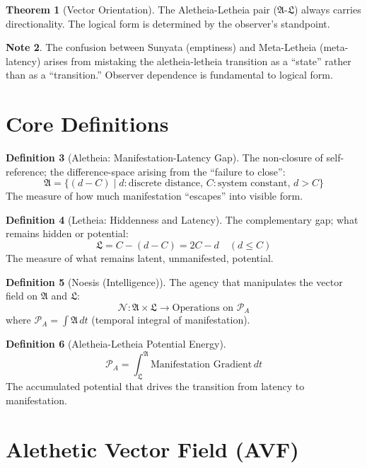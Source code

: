 \documentclass[12pt,a4paper]{article}
\theoremstyle{definition}
\newtheorem{definition}{Definition}[section]
\newtheorem{theorem}[definition]{Theorem}
\newtheorem{note}[definition]{Note}
\newcommand{\aletheia}{\mathfrak{A}}
\newcommand{\letheia}{\mathfrak{L}}
\newcommand{\noesis}{\mathcal{N}}
\newcommand{\powa}{\mathcal{P}_A}
\begin{document}
\begin{theorem}[Vector Orientation]
The Aletheia-Letheia pair ($\aletheia$-$\letheia$) always carries directionality. The logical form is determined by the observer's standpoint.
\end{theorem}

\begin{note}
The confusion between Sunyata (emptiness) and Meta-Letheia (meta-latency) arises from mistaking the aletheia-letheia transition as a ``state'' rather than as a ``transition.'' Observer dependence is fundamental to logical form.
\end{note}

\section{Core Definitions}

\begin{definition}[Aletheia: Manifestation-Latency Gap]
The non-closure of self-reference; the difference-space arising from the ``failure to close'':
\[
\aletheia = \{ (d - C) \mid d : \text{discrete distance}, \, C : \text{system constant}, \, d > C \}
\]
The measure of how much manifestation ``escapes'' into visible form.
\end{definition}

\begin{definition}[Letheia: Hiddenness and Latency]
The complementary gap; what remains hidden or potential:
\[
\letheia = C - (d - C) = 2C - d \quad (d \leq C)
\]
The measure of what remains latent, unmanifested, potential.
\end{definition}

\begin{definition}[Noesis (Intelligence)]
The agency that manipulates the vector field on $\aletheia$ and $\letheia$:
\[
\noesis : \aletheia \times \letheia \to \text{Operations on } \powa
\]
where $\powa = \int \aletheia \, dt$ (temporal integral of manifestation).
\end{definition}

\begin{definition}[Aletheia-Letheia Potential Energy]
\[
\powa = \int_{\letheia}^{\aletheia} \text{Manifestation Gradient} \, dt
\]
The accumulated potential that drives the transition from latency to manifestation.
\end{definition}

\section{Alethetic Vector Field (AVF)}
\end{document}
